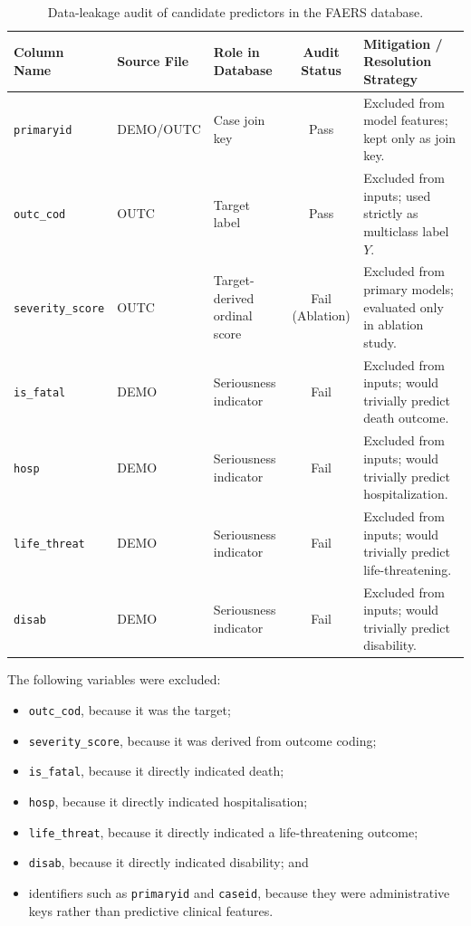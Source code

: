 \documentclass[10pt]{article}
\begin{document}
\begin{table}[htbp]
\caption{Data-leakage audit of candidate predictors in the FAERS database.}
\label{tab:leakage_audit}
\centering\small\setlength{\tabcolsep}{6pt}
\begin{tabularx}{\textwidth}{|l|l|>{\raggedright\arraybackslash\hsize=0.75\hsize}X|c|>{\raggedright\arraybackslash\hsize=1.25\hsize}X|}
\hline
\textbf{Column Name} & 
\textbf{Source File} & 
\textbf{Role in Database} & 
\textbf{Audit Status} & 
\textbf{Mitigation / Resolution Strategy}\\
\hline
\texttt{primaryid} & DEMO/OUTC & Case join key & Pass & Excluded from model features; kept only as join key. \\
\hline
\texttt{outc\_cod} & OUTC & Target label & Pass & Excluded from inputs; used strictly as multiclass label $Y$. \\
\hline
\texttt{severity\_score} & OUTC & Target-derived ordinal score & Fail (Ablation) & Excluded from primary models; evaluated only in ablation study. \\
\hline
\texttt{is\_fatal} & DEMO & Seriousness indicator & Fail & Excluded from inputs; would trivially predict death outcome. \\
\hline
\texttt{hosp} & DEMO & Seriousness indicator & Fail & Excluded from inputs; would trivially predict hospitalization. \\
\hline
\texttt{life\_threat} & DEMO & Seriousness indicator & Fail & Excluded from inputs; would trivially predict life-threatening. \\
\hline
\texttt{disab} & DEMO & Seriousness indicator & Fail & Excluded from inputs; would trivially predict disability. \\
\hline
\end{tabularx}
\end{table}

The following variables were excluded:
\begin{itemize}
\item \texttt{outc\_cod}, because it was the target;
\item \texttt{severity\_score}, because it was derived from outcome coding;
\item \texttt{is\_fatal}, because it directly indicated death;
\item \texttt{hosp}, because it directly indicated hospitalisation;
\item \texttt{life\_threat}, because it directly indicated a life-threatening outcome;
\item \texttt{disab}, because it directly indicated disability; and
\item identifiers such as \texttt{primaryid} and \texttt{caseid}, because they were administrative keys rather than predictive clinical features.
\end{itemize}
\end{document}
